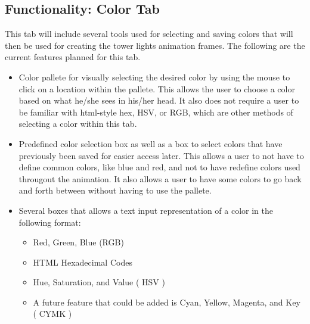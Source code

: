 \documentclass[12pt]{extarticle}
\begin{document}
	\subsection{Functionality: Color Tab}
This tab will include several tools used for selecting and saving colors that will then be used for creating the tower lights animation frames. The following are the current features planned for this tab.
	\begin{itemize}
			\item Color pallete for visually selecting the desired color by using the mouse to click on a location within the pallete.  This allows the user to choose a color based on what he/she sees in his/her head.  It also does not require a user to be familiar with html-style hex, HSV, or RGB, which are other methods of selecting a color within this tab.  
			\item Predefined color selection box as well as a box to select colors that have previously been saved for easier access later.  This allows a user to not have to define common colors, like blue and red, and not to have redefine colors used througout the animation.  It also allows a user to have some colors to go back and forth between without having to use the pallete.
			\item Several  boxes that allows a text input representation of a color in the following format:
		\begin{itemize}
				\item Red, Green, Blue (RGB)
				\item HTML Hexadecimal Codes
				\item Hue, Saturation, and Value ( HSV )
				\item A future feature that could be added is Cyan, Yellow, Magenta, and Key ( CYMK )
		\end{itemize}
	\end{itemize}
\end{document}
